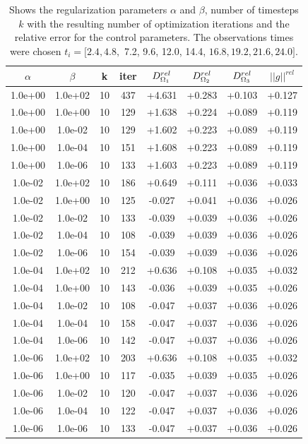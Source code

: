\documentclass[12pt,a4paper]{article}
\begin{document}
\begin{table}
\centering
\caption{Shows the regularization parameters $\alpha$ and $\beta$, number of timesteps $k$ with the resulting number of optimization iterations and the relative error for the control parameters. The observations times were chosen $ t_i=[2.4, 4.8,$ 7.2, 9.6, 12.0, 14.4, $16.8, 19.2, 21.6, 24.0]$.}
\begin{tabular}{*{8}c}
$\alpha$ & $\beta$ & k  & iter & $ D_{\Omega_1}\sp{rel}$ & $ D_{\Omega_2}\sp{rel} $ & $D_{\Omega_3}\sp{rel}$ & $||g||^{rel}$ \\
\hline 
 1.0e+00 	 & 1.0e+02 	 & 10 & 437 	 & +4.631 & +0.283 & +0.103 & +0.127 \\ 
 1.0e+00 	 & 1.0e+00 	 & 10 & 129 	 & +1.638 & +0.224 & +0.089 & +0.119 \\ 
 1.0e+00 	 & 1.0e-02 	 & 10 & 129 	 & +1.602 & +0.223 & +0.089 & +0.119 \\ 
 1.0e+00 	 & 1.0e-04 	 & 10 & 151 	 & +1.608 & +0.223 & +0.089 & +0.119 \\ 
 1.0e+00 	 & 1.0e-06 	 & 10 & 133 	 & +1.603 & +0.223 & +0.089 & +0.119 \\ 

 1.0e-02 	 & 1.0e+02 	 & 10 & 186 	 & +0.649 & +0.111 & +0.036 & +0.033 \\ 
 1.0e-02 	 & 1.0e+00 	 & 10 & 125 	 & -0.027 & +0.041 & +0.036 & +0.026 \\ 
 1.0e-02 	 & 1.0e-02 	 & 10 & 133 	 & -0.039 & +0.039 & +0.036 & +0.026 \\ 
 1.0e-02 	 & 1.0e-04 	 & 10 & 108 	 & -0.039 & +0.039 & +0.036 & +0.026 \\ 
 1.0e-02 	 & 1.0e-06 	 & 10 & 154 	 & -0.039 & +0.039 & +0.036 & +0.026 \\ 

 1.0e-04 	 & 1.0e+02 	 & 10 & 212 	 & +0.636 & +0.108 & +0.035 & +0.032 \\ 
 1.0e-04 	 & 1.0e+00 	 & 10 & 143 	 & -0.036 & +0.039 & +0.035 & +0.026 \\ 
 1.0e-04 	 & 1.0e-02 	 & 10 & 108 	 & -0.047 & +0.037 & +0.036 & +0.026 \\ 
 1.0e-04 	 & 1.0e-04 	 & 10 & 158 	 & -0.047 & +0.037 & +0.036 & +0.026 \\ 
 1.0e-04 	 & 1.0e-06 	 & 10 & 142 	 & -0.047 & +0.037 & +0.036 & +0.026 \\ 

 1.0e-06 	 & 1.0e+02 	 & 10 & 203 	 & +0.636 & +0.108 & +0.035 & +0.032 \\ 
 1.0e-06 	 & 1.0e+00 	 & 10 & 117 	 & -0.035 & +0.039 & +0.035 & +0.026 \\ 
 1.0e-06 	 & 1.0e-02 	 & 10 & 120 	 & -0.047 & +0.037 & +0.036 & +0.026 \\ 
 1.0e-06 	 & 1.0e-04 	 & 10 & 122 	 & -0.047 & +0.037 & +0.036 & +0.026 \\ 
 1.0e-06 	 & 1.0e-06 	 & 10 & 133 	 & -0.047 & +0.037 & +0.036 & +0.026 \\ 

\end{tabular}
\label{Tab::1}
\end{table} 
 
\end{document}
